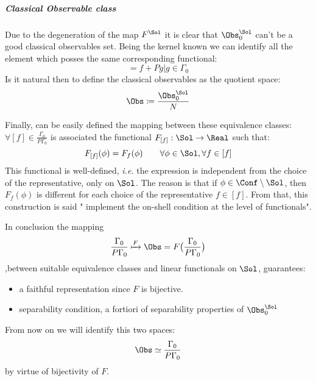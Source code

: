 \documentclass[Main]{subfiles}
\begin{document}
   			\subparagraph{Classical Observable class}
   					Due to the degeneration of the map $F^\Sol$ it is clear that $\Obs_0^\Sol$ can't be a good classical observables set.
   					Being the kernel known we can identify all the element which posses the same corresponding functional:
   					\begin{displaymath}
   						[f] = {f + P g \vert g \in \Gamma_0}
   					\end{displaymath}
   					Is it natural then to define the classical observables as the quotient space:
   									\begin{displaymath}
   										\Obs \coloneqq \frac{\Obs_0^\Sol}{N}
   									\end{displaymath}
   									
   					Finally, can be easily defined the mapping between these equivalence classes:\\
   					$\forall [f] \in \frac{\Gamma_0}{P\Gamma_0}$ is associated the functional $F_{[f]} : \Sol \rightarrow  \Real$ such that:
   					\begin{displaymath}
   						F_{[f]} (\phi) = F_f(\phi) \qquad \forall \phi \in \Sol , \forall f \in [f]
   					\end{displaymath}
   					This functional is well-defined, \textit{i.e.} the expression is independent from the choice of the representative, only on $\Sol$. 
   					The reason is that if $\phi \in \Conf \setminus \Sol$, then $F_f(\phi)$ is different for each choice of the representative $f \in [f]$.
   					From that, this construction is said " implement the  on-shell condition at the level of functionals".
   					
   					In conclusion the mapping 
   					\begin{displaymath}
   						\frac{\Gamma_0}{P \Gamma_0}  \xmapsto{F} \Obs = F \big( \frac{\Gamma_0}{P \Gamma_0}\big)
   					\end{displaymath}
   					,between suitable equivalence classes  and linear functionals on $\Sol$, guarantees:
   					\begin{itemize}
   						\item a faithful representation since $F$ is bijective.
   						\item separability condition, a fortiori of separability properties of $\Obs_0^\Sol$
   					\end{itemize}
   					From now on we will identify this two spaces:
   					\begin{displaymath}
   						\Obs \simeq 	\frac{\Gamma_0}{P \Gamma_0}
   					\end{displaymath}
   					by virtue of bijectivity of $F$.
   			
\end{document}

